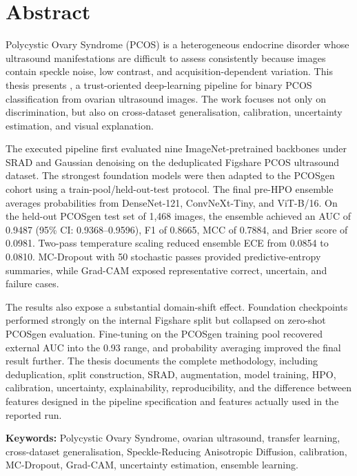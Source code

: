 \chapter*{Abstract}

Polycystic Ovary Syndrome (PCOS) is a heterogeneous endocrine disorder whose
ultrasound manifestations are difficult to assess consistently because images
contain speckle noise, low contrast, and acquisition-dependent variation. This
thesis presents \PEARL{}, a trust-oriented deep-learning pipeline for binary
PCOS classification from ovarian ultrasound images. The work focuses not only
on discrimination, but also on cross-dataset generalisation, calibration,
uncertainty estimation, and visual explanation.

The executed pipeline first evaluated nine ImageNet-pretrained backbones under
SRAD and Gaussian denoising on the deduplicated Figshare PCOS ultrasound
dataset. The strongest foundation models were then adapted to the PCOSgen
cohort using a train-pool/held-out-test protocol. The final pre-HPO ensemble
averages probabilities from DenseNet-121, ConvNeXt-Tiny, and ViT-B/16. On the
held-out PCOSgen test set of 1,468 images, the ensemble achieved an AUC of
0.9487 (95\% CI: 0.9368--0.9596), F1 of 0.8665, MCC of 0.7884, and Brier score
of 0.0981. Two-pass temperature scaling reduced ensemble ECE from 0.0854 to
0.0810. MC-Dropout with 50 stochastic passes provided predictive-entropy
summaries, while Grad-CAM exposed representative correct, uncertain, and
failure cases.

The results also expose a substantial domain-shift effect. Foundation
checkpoints performed strongly on the internal Figshare split but collapsed on
zero-shot PCOSgen evaluation. Fine-tuning on the PCOSgen training pool
recovered external AUC into the 0.93 range, and probability averaging improved
the final result further. The thesis documents the complete methodology,
including deduplication, split construction, SRAD, augmentation, model
training, HPO, calibration, uncertainty, explainability, reproducibility, and
the difference between features designed in the pipeline specification and
features actually used in the reported run.

\textbf{Keywords:} Polycystic Ovary Syndrome, ovarian ultrasound, transfer
learning, cross-dataset generalisation, Speckle-Reducing Anisotropic Diffusion,
calibration, MC-Dropout, Grad-CAM, uncertainty estimation, ensemble learning.
